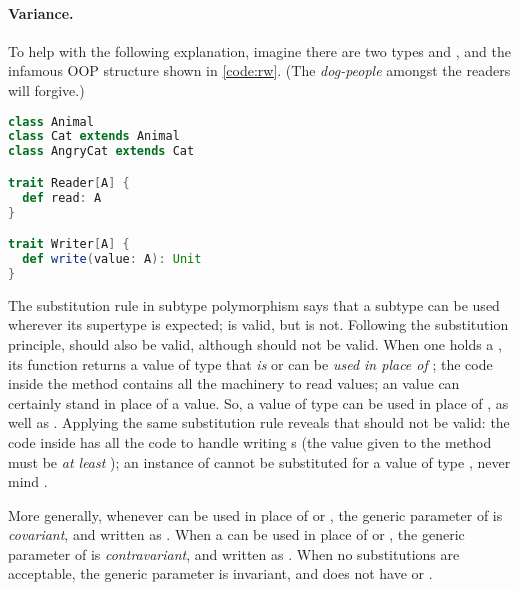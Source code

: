 \documentclass[10 pt]{article}
\begin{document}
\paragraph{Variance.} To help with the following explanation, imagine there are two types  and , and the infamous OOP structure shown in \autoref{code:rw}. (The \emph{dog-people} amongst the readers will forgive.)

\begin{lstlisting}[caption={Reader and Writer}, label={code:rw}, language=Scala, escapechar=|]
class Animal
class Cat extends Animal
class AngryCat extends Cat

trait Reader[A] {
  def read: A
}

trait Writer[A] {
  def write(value: A): Unit
}
\end{lstlisting}

The substitution rule in subtype polymorphism says that a subtype can be used wherever its supertype is expected;  is valid, but  is not. Following the substitution principle,  should also be valid, although  should not be valid. When one holds a , its  function returns a value of type that \emph{is} or can be \emph{used in place of} ; the code inside the  method contains all the machinery to read  values; an  value can certainly stand in place of a  value. So, a value of type  can be used in place of , as well as . Applying the same substitution rule reveals that  should not be valid: the code inside  has all the code to handle writing s (the value given to the  method must be \emph{at least} ); an instance of  cannot be substituted for a value of type , never mind . 

More generally, whenever  can be used in place of  or , the generic parameter of  is \emph{covariant}, and written as . When a  can be used in place of  or , the generic parameter of  is \emph{contravariant}, and written as . When no substitutions are acceptable, the generic parameter is invariant, and does not have \pcode{+} or \pcode{-}. 
\end{document}

